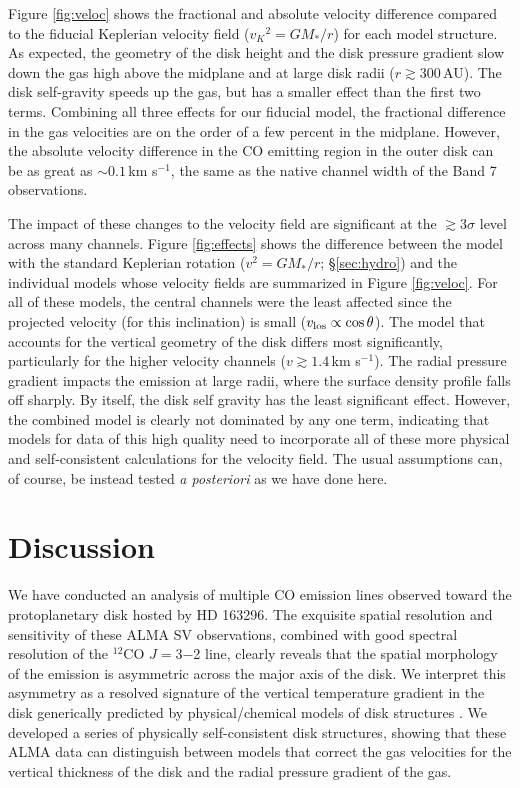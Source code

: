 Figure \ref{fig:veloc} shows the fractional and absolute velocity difference 
compared to the fiducial Keplerian velocity field (${v_K}^2 =G M_\ast/r$) for 
each model structure. As expected, the geometry of the disk height and the disk 
pressure gradient slow down the gas high above the midplane and at large disk 
radii ($r \gtrsim 300$\,AU).  The disk self-gravity speeds up the gas, but has 
a smaller effect than the first two terms.  Combining all three effects 
for our fiducial model, the fractional difference in the gas velocities are on 
the order of a few percent in the midplane.  However, the absolute velocity 
difference in the CO emitting region in the outer disk can be as great as 
$\sim0.1\,$km s$^{-1}$, the same as the native channel width of the Band 7 
observations. 

The impact of these changes to the velocity field are significant at the 
$\gtrsim 3 \sigma$ level across many channels.  Figure \ref{fig:effects} shows 
the difference between the model with the standard Keplerian rotation 
($v^2 =G M_\ast/r$; \S\ref{sec:hydro}) and the individual models whose velocity 
fields are summarized in Figure \ref{fig:veloc}.  For all of these models, the 
central channels were the least affected since the projected velocity (for this 
inclination) is small ($v_{\rm los} \propto \cos \theta$).  The model that 
accounts for the vertical geometry of the disk differs most significantly, 
particularly for the higher velocity channels ($v \gtrsim 1.4$\,km s$^{-1}$).  
The radial pressure gradient impacts the emission at large radii, where the 
surface density profile falls off sharply.  By itself, the disk self gravity has
the least significant effect.  However, the combined model is clearly not 
dominated by any one term, indicating that models for data of this high quality 
need to incorporate all of these more physical and self-consistent calculations 
for the velocity field.  The usual assumptions can, of course, be instead tested
{\it a posteriori} as we have done here.

\section{Discussion}\label{sec:discussion}

We have conducted an analysis of multiple CO emission lines observed toward the
protoplanetary disk hosted by HD 163296.  The exquisite spatial resolution and 
sensitivity of these ALMA SV observations, combined with good spectral 
resolution of the $^{12}$CO $J=$3$-$2 line, clearly reveals that the spatial 
morphology of the emission is asymmetric across the major axis of the disk.  We 
interpret this 
asymmetry as a resolved signature of the vertical temperature gradient in the 
disk generically predicted by physical/chemical models of disk structures 
\citep[e.g.,][]{pavlyuchenkov07,semenov08}.  We developed a series of 
physically self-consistent disk structures, showing that these ALMA data can 
distinguish between models that correct the gas velocities for the vertical 
thickness of the disk and the radial pressure gradient of the gas.

